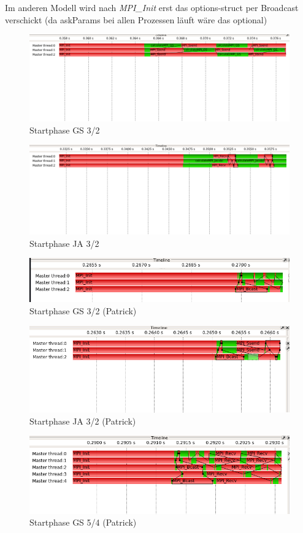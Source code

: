 \documentclass[a4paper,10pt]{article}
\begin{document}
Im anderen Modell wird nach \textit{MPI\_Init} erst das options-struct per Broadcast verschickt (da askParams bei allen Prozessen läuft wäre das optional)
\begin{figure}
  \caption{Startphase GS 3/2}
  \includegraphics[width=14cm]{c_start_GS_3x2.png}
\end{figure}
\begin{figure}
  \caption{Startphase JA 3/2}
  \includegraphics[width=14cm]{c_start_JA_3x2.png}
\end{figure}
\begin{figure}
  \caption{Startphase GS 3/2 (Patrick)}
  \includegraphics[width=14cm]{Patrick/c_start_GS_3x2.png}
\end{figure}
\begin{figure}
  \caption{Startphase JA 3/2 (Patrick)}
  \includegraphics[width=14cm]{Patrick/c_start_JA_3x2.png}
\end{figure}
\begin{figure}
  \caption{Startphase GS 5/4 (Patrick)}
  \includegraphics[width=14cm]{Patrick/c_start_GS_5x4.png}
\end{figure}
\end{document}
